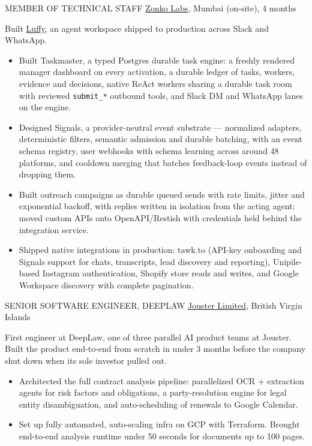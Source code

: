     {
        MEMBER OF TECHNICAL STAFF
    }
    {
        \href{https://zonko.ai}{Zonko Labs}, Mumbai (on-site), 4 months
    }
    {
        Built \href{https://luffy.so}{Luffy}, an agent workspace shipped to production across Slack and WhatsApp.

        \begin{itemize}
            \item Built Taskmaster, a typed Postgres durable task engine: a freshly rendered manager dashboard on every activation, a durable ledger of tasks, workers, evidence and decisions, native ReAct workers sharing a durable task room with reviewed \texttt{submit\_*} outbound tools, and Slack DM and WhatsApp lanes on the engine.
            \item Designed Signals, a provider-neutral event substrate --- normalized adapters, deterministic filters, semantic admission and durable batching, with an event schema registry, user webhooks with schema learning across around 48 platforms, and cooldown merging that batches feedback-loop events instead of dropping them.
            \item Built outreach campaigns as durable queued sends with rate limits, jitter and exponential backoff, with replies written in isolation from the acting agent; moved custom APIs onto OpenAPI/Restish with credentials held behind the integration service.
            \item Shipped native integrations in production: tawk.to (API-key onboarding and Signals support for chats, transcripts, lead discovery and reporting), Unipile-based Instagram authentication, Shopify store reads and writes, and Google Workspace discovery with complete pagination.
        \end{itemize}
    }


    {
        SENIOR SOFTWARE ENGINEER, DEEPLAW
    }
    {
        \href{https://jouster.com}{Jouster Limited}, British Virgin Islands
    }
    {
        First engineer at DeepLaw, one of three parallel AI product teams at Jouster. Built the product end-to-end from scratch in under 3 months before the company shut down when its sole investor pulled out.

        \begin{itemize}
            \item Architected the full contract analysis pipeline: parallelized OCR + extraction agents for risk factors and obligations, a party-resolution engine for legal entity disambiguation, and auto-scheduling of renewals to Google Calendar.
            \item Set up fully automated, auto-scaling infra on GCP with Terraform. Brought end-to-end analysis runtime under 50 seconds for documents up to 100 pages.
        \end{itemize}
    }


